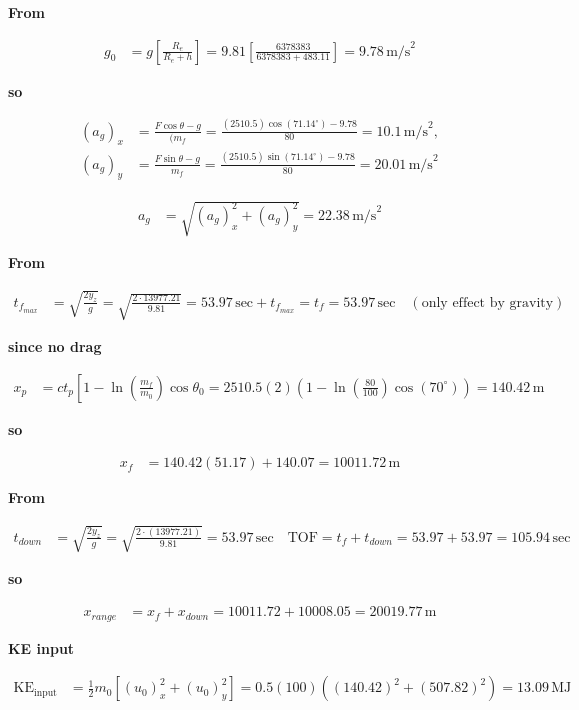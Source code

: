 \documentclass{article}
\begin{document}
\textbf{From}

\[
\begin{aligned}
    g_0 &= g \left[\frac{R_e}{R_e + h}\right] = 9.81 \left[\frac{6378383}{6378383 + 483.11}\right] = 9.78 \, \text{m/s}^2
\end{aligned}
\]

\textbf{so}

\[
\begin{aligned}
    (a_g)_x &= \frac{F\cos\theta - g}{(m_f} = \frac{(2510.5)\cos(71.14^\circ) - 9.78}{80} = 10.1 \, \text{m/s}^2, \\
    (a_g)_y &= \frac{F\sin\theta - g}{m_f} = \frac{(2510.5)\sin(71.14^\circ) - 9.78}{80} = 20.01 \, \text{m/s}^2
\end{aligned}
\]

\[
\begin{aligned}
    a_g &= \sqrt{(a_g)_x^2 + (a_g)_y^2} = 22.38 \, \text{m/s}^2
\end{aligned}
\]

\textbf{From}

\[
\begin{aligned}
    t_{f_{max}} &= \sqrt{\frac{2y_z}{g}} = \sqrt{\frac{2 \cdot 13977.21}{9.81}} = 53.97 \, \text{sec} + t_{f_{max}} = t_f = 53.97 \, \text{sec} \quad (\text{only effect by gravity})
\end{aligned}
\]

\textbf{since no drag}

\[
\begin{aligned}
    x_p &= c t_p \left[1 - \ln\left(\frac{m_f}{m_0}\right) \cos\theta_0 = 2510.5 (2) \left(1 - \ln\left(\frac{80}{100}\right) \cos(70^\circ)\right) = 140.42 \, \text{m}
\end{aligned}
\]

\textbf{so}

\[
\begin{aligned}
    x_f &= 140.42 (51.17) + 140.07 = 10011.72 \, \text{m}
\end{aligned}
\]

\textbf{From}

\[
\begin{aligned}
    t_{down} &= \sqrt{\frac{2y_z}{g}} = \sqrt{\frac{2 \cdot (13977.21)}{9.81}} = 53.97 \, \text{sec} \quad \text{TOF} = t_f + t_{down} = 53.97 + 53.97 = 105.94 \, \text{sec}
\end{aligned}
\]

\textbf{so}

\[
\begin{aligned}
    x_{range} &= x_f + x_{down} = 10011.72 + 10008.05 = 20019.77 \, \text{m}
\end{aligned}
\]

\textbf{KE input}

\[
\begin{aligned}
    \text{KE}_{\text{input}} &= \frac{1}{2} m_0 \left[(u_0)_x^2 + (u_0)_y^2\right] = 0.5 (100) \left((140.42)^2 + (507.82)^2\right) = 13.09 \, \text{MJ}
\end{aligned}
\]
\end{document}
